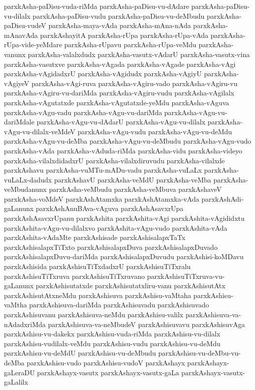 {parxkAsha-paDisu-vuda-riMda
parxkAsha-paDisu-vu-dAdare
parxkAsha-paDisu-vu-dilalx
parxkAsha-paDisu-vudu
parxkAsha-paDisu-vu-deMbudu
parxkAsha-paDisu-vudeV
parxkAsha-maya-vAda
parxkAsha-mAna-nAda
parxkAsha-mAnavAda
parxkAshayitA
parxkAsha-rUpa
parxkAsha-rUpa-vAda
parxkAsha-rUpa-vide-yeMdare
parxkAsha-rUpavu
parxkAsha-rUpa-veMdu
parxkAsha-vanunx
parxkAsha-valalxdudx
parxkAsha-vasutx-vAdarU
parxkAsha-vasutx-vina
parxkAsha-vasutxve
parxkAsha-vAgada
parxkAsha-vAgade
parxkAsha-vAgi
parxkAsha-vAgidadxrU
parxkAsha-vAgidudx
parxkAsha-vAgiyU
parxkAsha-vAgiyeV
parxkAsha-vAgi-ruva
parxkAsha-vAgiru-vado
parxkAsha-vAgiru-vu
parxkAsha-vAgiru-vu-dariMda
parxkAsha-vAgiru-vudu
parxkAsha-vAgilalx
parxkAsha-vAgutatxde
parxkAsha-vAgutatxde-yeMdu
parxkAsha-vAguva
parxkAsha-vAgu-vadu
parxkAsha-vAgu-vu-dariMda
parxkAsha-vAgu-vu-dariMdale
parxkAsha-vAgu-vu-dAdarU
parxkAsha-vAgu-vu-dilalx
parxkAsha-vAgu-vu-dilalx-veMdeV
parxkAsha-vAgu-vudu
parxkAsha-vAgu-vu-deMdu
parxkAsha-vAgu-vu-deMba
parxkAsha-vAgu-vu-deMbudu
parxkAsha-vAgu-vudo
parxkAsha-vAda
parxkAsha-vAduda-riMda
parxkAsha-vidu
parxkAsha-videyo
parxkAsha-vilalxdidadxrU
parxkAsha-vilalxdiruvudu
parxkAsha-vilalxde
parxkAshavu
parxkAsha-vuMTu-mADu-vadu
parxkAsha-vuLaLx
parxkAsha-vuLaLx-dadudx
parxkAshavU
parxkAsha-veMdU
parxkAsha-veMba
parxkAsha-veMbudanunx
parxkAsha-veMbudu
parxkAsha-veMbuva
parxkAshaveV
parxkAsha-voMdeV
parxkAshAtamxka
parxkAshAtamxka-vAda
parxkAshAdi-gaLanunx
parxkAshAnuBAva-vAguva
parxkAshAsavxrUpa
parxkAshAsavxrUpanu
parxkAshita
parxkAshita-vAgi
parxkAshita-vAgididxtu
parxkAshita-vAgu-vu-dilalxvo
parxkAshita-vAgu-vudo
parxkAshita-vAda
parxkAshita-vAdaMte
parxkAshisade
parxkAshisalapxTaTx
parxkAshisalapxTiTxto
parxkAshisalapxDuva
parxkAshisalapxDuvado
parxkAshisalapxDuvu-dariMda
parxkAshisalapxDuvudu
parxkAshisi-koMDavu
parxkAshisida
parxkAshisuTiTxdadxrU
parxkAshisuTiTxralu
parxkAshisuTiTxruva
parxkAshisuTiTxruvano
parxkAshisuTiTxruva-vu-gaLanunx
parxkAshisutatxde
parxkAshisutatxliru-vanu
parxkAshisutAtx
parxkAshisutAtxneMdu
parxkAshisuva
parxkAshisu-vaMtaha
parxkAshisu-vaMtha
parxkAshisuva-dariMda
parxkAshisuvadu
parxkAshisuvado
parxkAshisuvanu
parxkAshisuva-neMdu
parxkAshisu-valilx
parxkAshisuva-va-nAdadxriMda
parxkAshisuva-va-neMbudeV
parxkAshisuvavu
parxkAshisuvAga
parxkAshisu-vu-dakekx
parxkAshisu-vuda-riMda
parxkAshisu-vu-dilalx
parxkAshisu-vudilalx-veMdu
parxkAshisu-vudu
parxkAshisu-vu-deMdu
parxkAshisu-vu-deMdU
parxkAshisu-vu-deMbudu
parxkAshisu-vu-deMbu-vu-deMba
parxkAshisu-vudo
parxkAshisu-vudoV
parxkAshayx
parxkAshayx-gaLeraDU
parxkAshayx-vasutx
parxkAshayx-vasutx-gaLa
parxkAshayx-vasutx-gaLalilx
}
